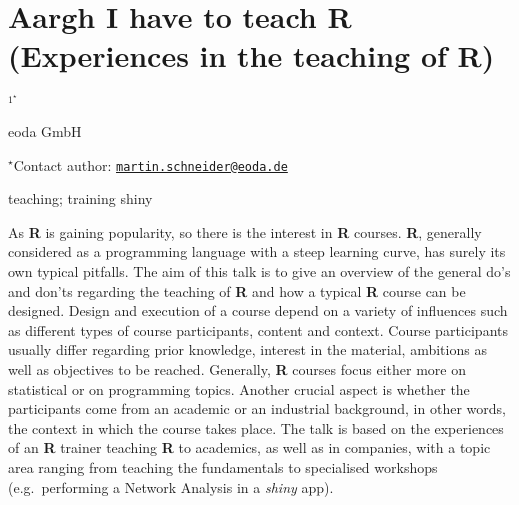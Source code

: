 \documentclass[\main/boa.tex]{subfiles}
\begin{document}
\section{Aargh I have to teach R (Experiences in the teaching of R)}

\begin{center}
  {\bf {}$^{1^\star}$}
\end{center}

\vskip 0.3cm

\begin{affiliations}
\begin{enumerate}
\begin{minipage}{0.915\textwidth}
\centering
\item eoda GmbH \\[-2pt]
\end{minipage}
\end{enumerate}
$^\star$Contact author: \href{mailto:martin.schneider@eoda.de}{\nolinkurl{martin.schneider@eoda.de}}\\
\end{affiliations}

\vskip 0.5cm

\begin{minipage}{0.915\textwidth}
\keywords teaching; training
\packages shiny
\end{minipage}

\vskip 0.8cm

As \textbf{R} is gaining popularity, so there is the interest in
\textbf{R} courses. \textbf{R}, generally considered as a programming
language with a steep learning curve, has surely its own typical
pitfalls. The aim of this talk is to give an overview of the general
do's and don'ts regarding the teaching of \textbf{R} and how a typical
\textbf{R} course can be designed. Design and execution of a course
depend on a variety of influences such as different types of course
participants, content and context. Course participants usually differ
regarding prior knowledge, interest in the material, ambitions as well
as objectives to be reached. Generally, \textbf{R} courses focus either
more on statistical or on programming topics. Another crucial aspect is
whether the participants come from an academic or an industrial
background, in other words, the context in which the course takes place.
The talk is based on the experiences of an \textbf{R} trainer teaching
\textbf{R} to academics, as well as in companies, with a topic area
ranging from teaching the fundamentals to specialised workshops
(e.g.~performing a Network Analysis in a \emph{shiny} app).
\end{document}

